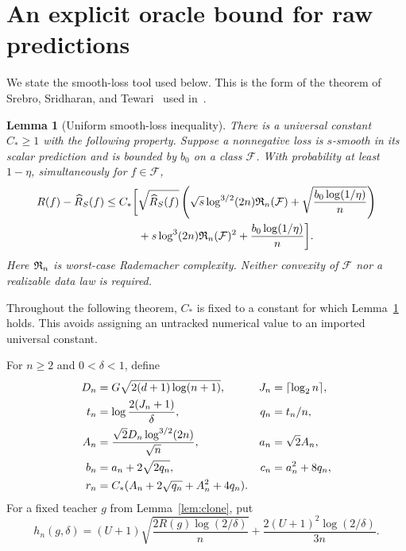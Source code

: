 \documentclass[11pt]{article}
\newtheorem{lemma}[theorem]{Lemma}
\theoremstyle{definition}\newtheorem{definition}[theorem]{Definition}
\theoremstyle{remark}\newtheorem{remark}[theorem]{Remark}
\begin{document}
\section{An explicit oracle bound for raw predictions}

We state the smooth-loss tool used below. This is the form of the theorem of Srebro, Sridharan, and Tewari~\cite[Theorem 1]{sst} used in~\cite{sharper}.

\begin{lemma}[Uniform smooth-loss inequality]
\label{lem:sst}
There is a universal constant $C_*\geq1$ with the following property. Suppose a nonnegative loss is $s$-smooth in its scalar prediction and is bounded by $b_0$ on a class $\mathcal F$. With probability at least $1-\eta$, simultaneously for $f\in\mathcal F$,
\begin{align}
 R(f)-\widehat R_S(f)
 \leq C_*\biggl[&\sqrt{\widehat R_S(f)}
  \left(\sqrt{s}\log^{3/2}(2n)\mathfrak R_n(\mathcal F)
                 +\sqrt{\frac{b_0\log(1/\eta)}n}\right)\notag\\
 &+s\log^3(2n)\mathfrak R_n(\mathcal F)^2
                 +\frac{b_0\log(1/\eta)}n\biggr].
 \label{eq:sst}
\end{align}
Here $\mathfrak R_n$ is worst-case Rademacher complexity. Neither convexity of $\mathcal F$ nor a realizable data law is required.
\end{lemma}

Throughout the following theorem, $C_*$ is fixed to a constant for which Lemma~\ref{lem:sst} holds. This avoids assigning an untracked numerical value to an imported universal constant.

For $n\geq2$ and $0<\delta<1$, define
\begin{align}
 D_n&=G\sqrt{2(d+1)\log(n+1)}, &
 J_n&=\lceil\log_2n\rceil,\notag\\
 t_n&=\log\frac{2(J_n+1)}\delta, & q_n&=t_n/n,\notag\\
 A_n&=\frac{\sqrt2D_n\log^{3/2}(2n)}{\sqrt n}, &
 a_n&=\sqrt2 A_n,\notag\\
 b_n&=a_n+2\sqrt{2q_n},&c_n&=a_n^2+8q_n,\notag\\
 r_n&=C_*(A_n+2\sqrt{q_n}+A_n^2+4q_n).&&
 \label{eq:constants}
\end{align}
For a fixed teacher $g$ from Lemma~\ref{lem:clone}, put
\begin{equation}
 h_n(g,\delta)=(U+1)\sqrt{\frac{2R(g)\log(2/\delta)}n}
             +\frac{2(U+1)^2\log(2/\delta)}{3n}.
 \label{eq:teacher-concentration}
\end{equation}
\end{document}
